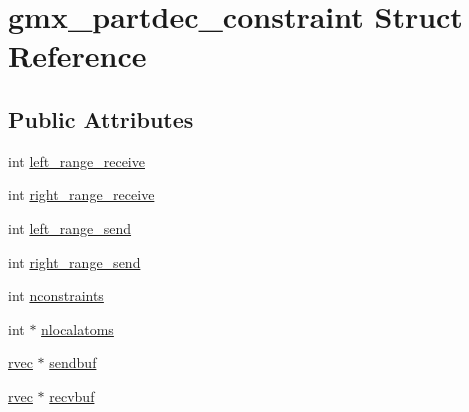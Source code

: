 \hypertarget{structgmx__partdec__constraint}{\section{gmx\-\_\-partdec\-\_\-constraint \-Struct \-Reference}
\label{structgmx__partdec__constraint}
}
\subsection*{\-Public \-Attributes}
\begin{DoxyCompactItemize}
\item 
int \hyperlink{structgmx__partdec__constraint_a13da31184b00c3ea2ece35360430938f}{left\-\_\-range\-\_\-receive}
\item 
int \hyperlink{structgmx__partdec__constraint_abd83f817243d2d42e853fd7f218d532f}{right\-\_\-range\-\_\-receive}
\item 
int \hyperlink{structgmx__partdec__constraint_aa357c23e69e446b398e0904bef8c6766}{left\-\_\-range\-\_\-send}
\item 
int \hyperlink{structgmx__partdec__constraint_a1bf973f659bee0cb56f508e5b007d4d4}{right\-\_\-range\-\_\-send}
\item 
int \hyperlink{structgmx__partdec__constraint_a16df39571ac9c09f5ed4b23e392bb386}{nconstraints}
\item 
int $\ast$ \hyperlink{structgmx__partdec__constraint_ae725aa49ef8b31cedb46e7403402fdb5}{nlocalatoms}
\item 
\hyperlink{share_2template_2gromacs_2types_2simple_8h_aa02a552a4abd2f180c282a083dc3a999}{rvec} $\ast$ \hyperlink{structgmx__partdec__constraint_ad6204542555bf681bc657094093b631b}{sendbuf}
\item 
\hyperlink{share_2template_2gromacs_2types_2simple_8h_aa02a552a4abd2f180c282a083dc3a999}{rvec} $\ast$ \hyperlink{structgmx__partdec__constraint_a1820279098a10de9b573d955f05fb87f}{recvbuf}
\end{DoxyCompactItemize}


